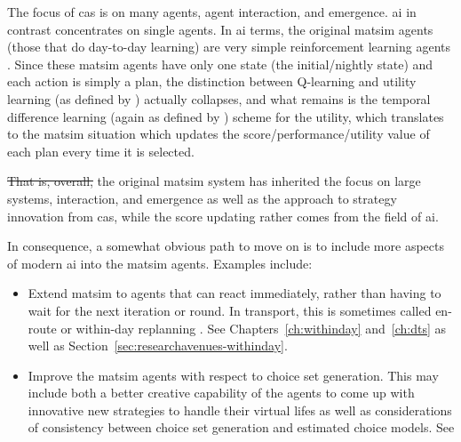 The focus of \gls{cas} is on many agents, agent interaction, and emergence. \Gls{ai} in contrast concentrates on single agents. In \gls{ai} terms, the original \gls{matsim} agents (those that do day-to-day learning) are very simple 
reinforcement learning agents \citep[][Chapter 21.3]{RusselNorvig2010ArtificialIntelligence}. Since these \gls{matsim} agents have only one state (the initial/nightly state) and each action is simply a plan, the distinction between Q-learning and utility learning (as defined by \cite{RusselNorvig2010ArtificialIntelligence}) actually collapses, and what remains is the temporal difference 
learning (again as defined by \cite{RusselNorvig2010ArtificialIntelligence}) scheme for the utility, which translates to the \gls{matsim} situation which updates the score/performance/utility value of each plan every time it is selected.

\st{That is, overall,}  the original \gls{matsim} system has inherited the focus on large systems, interaction, and emergence as well as the approach to strategy innovation from \gls{cas}, while the score updating rather comes from the field of \gls{ai}.

In consequence, a somewhat obvious path to move on is to include more aspects of modern \gls{ai} into the \gls{matsim} agents.  Examples include:
\begin{itemize}

\item Extend \gls{matsim} to agents that can react 
immediately, rather than having to wait for the next iteration or round.  In transport, this is sometimes called en-route or within-day replanning \citep[e.g.,][]{EmmerinkEtAl_TransResC_1995,balijepalli-2007}.  See Chapters~\ref{ch:withinday} and~\ref{ch:dts} as well as Section~\ref{sec:researchavenues-withinday}.

\item Improve the \gls{matsim} agents with respect to choice set generation.  This may include both a better creative capability of the agents to come up with innovative new strategies to handle their virtual lifes as well as considerations of consistency between choice set generation and estimated choice models.  See 

\end{itemize}


